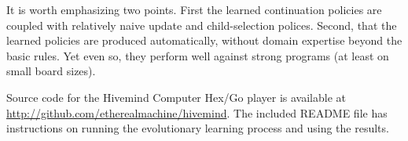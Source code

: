 \documentclass{acm_proc_article-sp}
\begin{document}
It is worth emphasizing two points.
First the learned continuation policies are coupled with relatively naive update and child-selection
polices.
Second, that the learned policies are produced automatically, without domain expertise beyond the basic rules.
Yet even so, they perform well against strong programs (at least on small board sizes).

Source code for the Hivemind Computer Hex/Go player is available at \url{http://github.com/etherealmachine/hivemind}. The included README file has instructions on running the evolutionary learning process and using the results.






\end{document}
